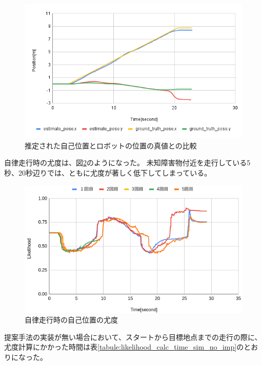 \begin{figure}[H]
  \begin{center}
    \includegraphics[width=0.98\linewidth]{figs/sim_no_imp_ground_truth.png}
    \caption{推定された自己位置とロボットの位置の真値との比較}
    \label{fig:odom_comp_no_imp}
  \end{center}
\end{figure}

自律走行時の尤度は、図\ref{fig:nav_likelihood_no_imp}のようになった。
未知障害物付近を走行している5秒、20秒辺りでは、ともに尤度が著しく低下してしまっている。

\begin{figure}[H]
  \begin{center}
    \includegraphics[width=0.98\linewidth]{figs/sim_likelihood_before.png}
    \caption{自律走行時の自己位置の尤度}
    \label{fig:nav_likelihood_no_imp}
  \end{center}
\end{figure}

提案手法の実装が無い場合において、スタートから目標地点までの走行の際に、
尤度計算にかかった時間は表\ref{tabule:likelihood_calc_time_sim_no_imp}のとおりになった。

